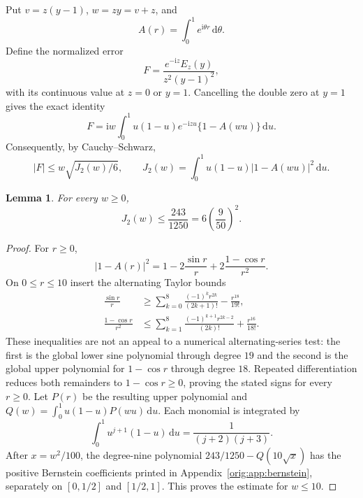 \documentclass[11pt,a4paper]{article}
\numberwithin{equation}{section}
\newtheorem{lemma}[theorem]{Lemma}
\theoremstyle{definition}
\theoremstyle{remark}
\newcommand{\ii}{\mathrm i}
\newcommand{\dd}{\,\mathrm d}
\begin{document}
Put $v=z(y-1)$, $w=zy=v+z$, and
\[
 A(r)=\int_0^1e^{\ii\theta r}\dd\theta.
\]
Define the normalized error
\[
 F=\frac{e^{-\ii z}E_z(y)}{z^2(y-1)^2},
\]
with its continuous value at $z=0$ or $y=1$.  Cancelling the double zero at
$y=1$ gives the exact identity
\[
 F=\ii w\int_0^1u(1-u)e^{-\ii zu}\{1-A(wu)\}\dd u.
\]
Consequently, by Cauchy--Schwarz,
\begin{equation}\label{orig:eq:FJ2}
 |F|\le w\sqrt{J_2(w)/6},\qquad
 J_2(w)=\int_0^1u(1-u)|1-A(wu)|^2\dd u.
\end{equation}

\begin{lemma}\label{orig:lem:J2}
For every $w\ge0$,
\[
 J_2(w)\le\frac{243}{1250}=6\left(\frac9{50}\right)^2.
\]
\end{lemma}

\begin{proof}
For $r\ge0$,
\[
 |1-A(r)|^2=1-2\frac{\sin r}{r}
                 +2\frac{1-\cos r}{r^2}.
\]
On $0\le r\le10$ insert the alternating Taylor bounds
\begin{align*}
 \frac{\sin r}{r}&\ge
 \sum_{k=0}^{8}\frac{(-1)^kr^{2k}}{(2k+1)!}-\frac{r^{18}}{19!},\\
 \frac{1-\cos r}{r^2}&\le
 \sum_{k=1}^{8}\frac{(-1)^{k+1}r^{2k-2}}{(2k)!}
 +\frac{r^{16}}{18!}.
\end{align*}
These inequalities are not an appeal to a numerical alternating-series
test: the first is the global lower sine polynomial through degree $19$
and the second is the global upper polynomial for $1-\cos r$ through degree
$18$.  Repeated differentiation reduces both remainders to
$1-\cos r\ge0$, proving the stated signs for every $r\ge0$.
Let $P(r)$ be the resulting upper polynomial and
$Q(w)=\int_0^1u(1-u)P(wu)\dd u$.  Each monomial is integrated by
\[
 \int_0^1u^{j+1}(1-u)\dd u=\frac1{(j+2)(j+3)}.
\]
After $x=w^2/100$, the degree-nine polynomial
$243/1250-Q(10\sqrt x)$ has the positive Bernstein coefficients printed
in Appendix~\ref{orig:app:bernstein}, separately on $[0,1/2]$ and $[1/2,1]$.
This proves the estimate for $w\le10$.


\end{proof}
\end{document}
